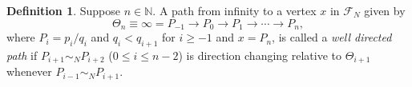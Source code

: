 \documentclass[12pt]{elsarticle}
\newtheorem{proposition}[theorem]{Proposition}
\theoremstyle{definition}
\newtheorem{defi}{Definition}
\newcommand{\field}[1]{\mathbb{#1}}          \newcommand{\Q}{\field{Q}}
\newcommand{\N}{\field{N}}
\newcommand{\mX}{{\mathcal X}}
\newcommand{\f}{{\mathcal F}}
\begin{document}
%  	 
\begin{defi} Suppose $n\in\N.$
	A path from infinity to a vertex $x$ in $\f_N$ given by
	$$\Theta_n\equiv\infty=P_{-1}\rightarrow P_0\rightarrow P_1\rightarrow\cdots \to  P_n,$$	where $P_i=p_i/q_i$ and $q_{i}<q_{i+1}$ for $i\ge-1$ and $x=P_n$, is called a \textit{well directed path} if  $P_{i+1}\sim_NP_{i+2}$ ($0\le i\le n-2$) is direction changing relative to  $\Theta_{i+1}$ whenever  $P_{i-1}\sim_N P_{i+1}$.
\end{defi}
%
\end{document}
